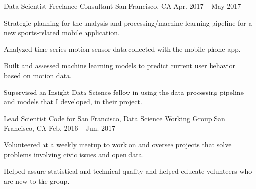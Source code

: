 \begin{cventries}
  \cventry
    {Data Scientist} %
    {Freelance Consultant} %
    {San Francisco, CA} %
    {Apr. 2017 -- May 2017} %
    {
      \begin{cvitems} %
        \item {Strategic planning for the analysis and processing/machine learning pipeline for a new sports-related mobile application.}
        \item {Analyzed time series motion sensor data collected with the mobile phone app.}
        \item {Built and assessed machine learning models to predict current user behavior based on motion data.}
        \item {Supervised an Insight Data Science fellow in using the data processing pipeline and models that I developed, in their project.}
     \end{cvitems}
    }

  \cventry
    {Lead Scientist} %
    {\href{https://github.com/sfbrigade/data-science-wg}{Code for San Francisco, Data Science Working Group}} %
    {San Francisco, CA} %
    {Feb. 2016 -- Jun. 2017} %
    {
      \begin{cvitems} %
        \item {Volunteered at a weekly meetup to work on and oversee projects that solve problems involving civic issues and open data.}
        \item {Helped assure statistical and technical quality and helped educate volunteers who are new to the group.}
      \end{cvitems}
    }


\end{cventries}

